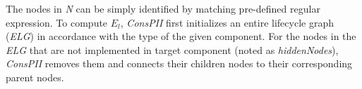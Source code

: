 

The nodes in \textit{N} can be simply identified by matching pre-defined regular expression.
To compute $E_{l}$, \textit{ConsPII} first initializes an entire lifecycle graph (\textit{ELG}) in accordance with the type of the given component. 
For the nodes in the \textit{ELG} that are not implemented in target component (noted as \textit{hiddenNodes}), \textit{ConsPII} 
removes them and connects their children nodes to their corresponding parent nodes.


